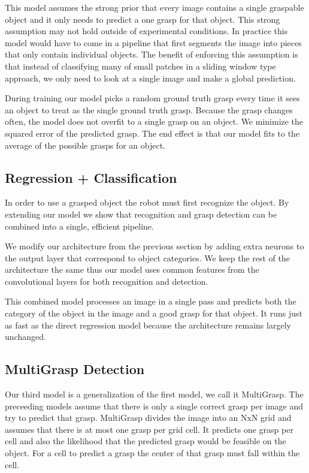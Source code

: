 \documentclass[letterpaper, 10 pt, conference]{ieeeconf}
\begin{document}
This model assumes the strong prior that every image contains a single graspable object and it only needs to predict a one grasp for that object. This strong assumption may not hold outside of experimental conditions. In practice this model would have to come in a pipeline that first segments the image into pieces that only contain individual objects. The benefit of enforcing this assumption is that instead of classifying many of small patches in a sliding window type approach, we only need to look at a single image and make a global prediction.

During training our model picks a random ground truth grasp every time it sees an object to treat as the single ground truth grasp. Because the grasp changes often, the model does not overfit to a single grasp on an object. We minimize the squared error of the predicted grasp. The end effect is that our model fits to the average of the possible grasps for an object.

\subsection{Regression + Classification}

In order to use a grasped object the robot must first recognize the object. By extending our model we show that recognition and grasp detection can be combined into a single, efficient pipeline. 

We modify our architecture from the previous section by adding extra neurons to the output layer that correspond to object categories. We keep the rest of the architecture the same thus our model uses common features from the convolutional layers for both recognition and detection.

This combined model processes an image in a single pass and predicts both the category of the object in the image and a good grasp for that object. It runs just as fast as the direct regression model because the architecture remains largely unchanged.

\subsection{MultiGrasp Detection}

Our third model is a generalization of the first model, we call it MultiGrasp. The preceeding models assume that there is only a single correct grasp per image and try to predict that grasp. MultiGrasp divides the image into an NxN grid and assumes that there is at most one grasp per grid cell. It predicts one grasp per cell and also the likelihood that the predicted grasp would be feasible on the object. For a cell to predict a grasp the center of that grasp must fall within the cell.
\end{document}

